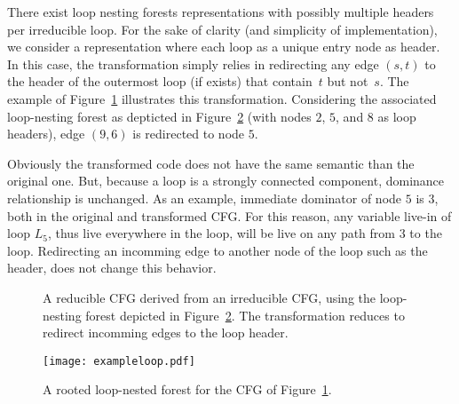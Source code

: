 There exist loop nesting forests representations with possibly multiple headers per irreducible loop.
For the sake of clarity (and simplicity of implementation), we consider a representation where each loop as a unique entry node as header.
In this case, the transformation simply relies in redirecting any edge $(s,t)$ to the header of the outermost loop (if exists) that contain~$t$ but not~$s$.
The example of Figure~\ref{fig:examplecfg} illustrates this transformation.
Considering the associated loop-nesting forest as depticted in Figure~\ref{fig:exampleloop} (with nodes $2$, $5$, and $8$ as loop headers), edge $(9,6)$ is redirected to node $5$.

Obviously the transformed code does not have the same semantic than the original one.
But, because a loop is a strongly connected component, dominance relationship is unchanged.
As an example, immediate dominator of node $5$ is $3$, both in the original and transformed CFG.
For this reason, any variable live-in of loop $L_5$, thus live everywhere in the loop, will be live on any path from $3$ to the loop.
Redirecting an incomming edge to another node of the loop such as the header, does not change this behavior.

\begin{figure}[t]
  \begin{center}
    \hspace{4mm}
  \end{center}
  \caption{%
	  A reducible CFG derived from an irreducible CFG, using the loop-nesting forest depicted in Figure~\ref{fig:exampleloop}.
	  The transformation reduces to redirect incomming edges to the loop header.}
  \label{fig:examplecfg}
\end{figure}

\begin{figure}[t]
  \begin{center}
    \texttt{[image: exampleloop.pdf]}
  \end{center}
  \caption{A rooted loop-nested forest for the CFG of Figure~\ref{fig:examplecfg}.}
  \label{fig:exampleloop}
\end{figure}

\newcommand{\OLE}[2]{#1.\textsf{OLE}(#2)}


